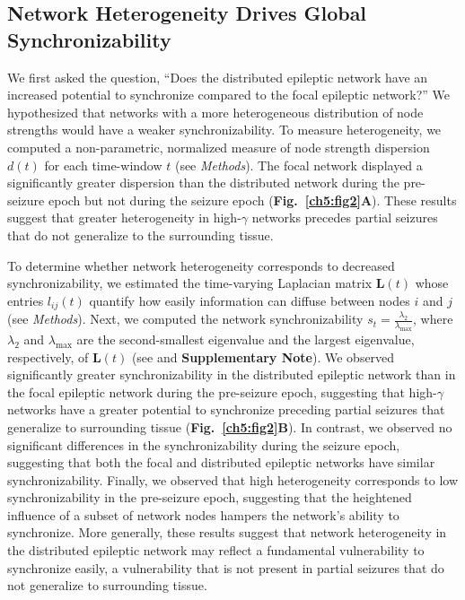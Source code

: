\subsection{Network Heterogeneity Drives Global Synchronizability}
We first asked the question, ``Does the distributed epileptic network have an increased potential to synchronize compared to the focal epileptic network?'' We hypothesized that networks with a more heterogeneous distribution of node strengths would have a weaker synchronizability. To measure heterogeneity, we computed a non-parametric, normalized measure of node strength dispersion $d(t)$ for each time-window $t$ (see \textit{Methods}). The focal network displayed a significantly greater dispersion than the distributed network during the pre-seizure epoch but not during the seizure epoch (\textbf{Fig.~\ref{ch5:fig2}A}). These results suggest that greater heterogeneity in high-$\gamma$ networks precedes partial seizures that do not generalize to the surrounding tissue.

To determine whether network heterogeneity corresponds to decreased synchronizability, we estimated the time-varying Laplacian matrix $\textbf{L}(t)$ whose entries $l_{ij}(t)$ quantify how easily information can diffuse between nodes $i$ and $j$ (see \textit{Methods}). Next, we computed the network synchronizability $s_{t}=\frac{\lambda_2}{\lambda_\text{max}}$, where $\lambda_2$ and $\lambda_\text{max}$ are the second-smallest eigenvalue and the largest eigenvalue, respectively, of $\textbf{L}(t)$ (see \cite{barahona2002synchronization} and \textbf{Supplementary Note}). We observed significantly greater synchronizability in the distributed epileptic network than in the focal epileptic network during the pre-seizure epoch, suggesting that high-$\gamma$ networks have a greater potential to synchronize preceding partial seizures that generalize to surrounding tissue (\textbf{Fig.~\ref{ch5:fig2}B}). In contrast, we observed no significant differences in the synchronizability during the seizure epoch, suggesting that both the focal and distributed epileptic networks have similar synchronizability. Finally, we observed that high heterogeneity corresponds to low synchronizability in the pre-seizure epoch, suggesting that the heightened influence of a subset of network nodes hampers the network's ability to synchronize. More generally, these results suggest that network heterogeneity in the distributed epileptic network may reflect a fundamental vulnerability to synchronize easily, a vulnerability that is not present in partial seizures that do not generalize to surrounding tissue.

